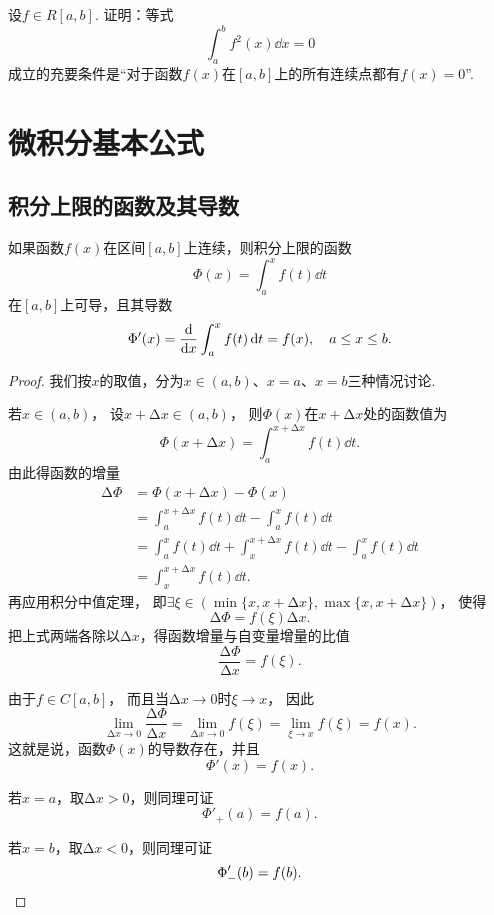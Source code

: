 \begin{example}
设\(f \in R[a,b]\).
证明：等式\[
\int_a^b f^2(x) \dd{x} = 0
\]成立的充要条件是“对于函数\(f(x)\)在\([a,b]\)上的所有连续点都有\(f(x)=0\)”.
\end{example}

\section{微积分基本公式}
\subsection{积分上限的函数及其导数}
\begin{theorem}[变限积分可导定理]\label{theorem:定积分.变限积分可导定理}
如果函数\(f(x)\)在区间\([a,b]\)上连续，则积分上限的函数\[
	\Phi(x)
	= \int_a^x f(t)\dd{t}
\]在\([a,b]\)上可导，且其导数\[
	\Phi'(x)
	= \dv{x} \int_a^x f(t) \dd{t}
	= f(x),
	\quad a \leq x \leq b.
\]
\begin{proof}
我们按\(x\)的取值，分为\(x\in(a,b)\)、\(x=a\)、\(x=b\)三种情况讨论.

若\(x\in(a,b)\)，
设\(x + \increment x \in (a,b)\)，
则\(\Phi(x)\)在\(x + \increment x\)处的函数值为\[
	\Phi(x + \increment x) = \int_a^{x+\increment x} f(t) \dd{t}.
\]
由此得函数的增量
\begin{align*}
	\increment\Phi
	&= \Phi(x + \increment x) - \Phi(x) \\
	&= \int_a^{x+\increment x} f(t) \dd{t} - \int_a^x f(t) \dd{t} \\
	&= \int_a^x f(t) \dd{t} + \int_x^{x+\increment x} f(t) \dd{t} - \int_a^x f(t) \dd{t} \\
	&= \int_x^{x+\increment x} f(t) \dd{t}.
\end{align*}
再应用积分中值定理，
即\(\exists\xi\in( \min\{x,x+\increment x\}, \max\{x,x+\increment x\} )\)，
使得\[
	\increment\Phi = f(\xi) \increment x.
\]
把上式两端各除以\(\increment x\)，得函数增量与自变量增量的比值\[
	\frac{\increment\Phi}{\increment x} = f(\xi).
\]

由于\(f \in C[a,b]\)，
而且当\(\increment x\to0\)时\(\xi \to x\)，
因此\[
	\lim\limits_{\increment x\to0} \frac{\increment\Phi}{\increment x}
	= \lim\limits_{\increment x\to0} f(\xi)
	= \lim\limits_{\xi \to x} f(\xi)
	= f(x).
\]
这就是说，函数\(\Phi(x)\)的导数存在，并且\[
	\Phi'(x) = f(x).
\]

若\(x = a\)，取\(\increment x > 0\)，则同理可证
\[
	\Phi'_+(a)=f(a).
\]

若\(x = b\)，取\(\increment x < 0\)，则同理可证
\[
	\Phi'_-(b)=f(b).
	\qedhere
\]
\end{proof}
\end{theorem}
